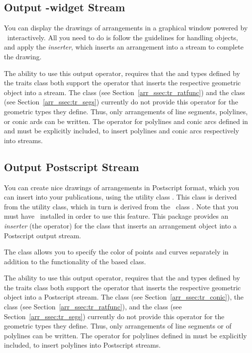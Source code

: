 \subsection{Output \qt{}-widget Stream}\label{arr_ssec:qt_stream}
You can display the drawings of arrangements in a graphical window
powered by \qt\ interactively. All you need to do is follow the
guidelines for handling  objects, and apply the
{\em inserter}, which inserts an arrangement into a 
stream to complete the drawing.

The ability to use this output operator, requires that the
 and  types defined by the
traits class both support the \ccc{<<} operator that inserts the
respective geometric object into a  stream. The
 class (see
Section~\ref{arr_ssec:tr_ratfunc}) and the 
class (see Section~\ref{arr_ssec:tr_segs}) currently do not provide
this operator for the geometric types they define. Thus, only
arrangements of line segments, polylines, or conic ards can be written.
The \ccc{<<} operator for polylines and conic arcs defined in
 and
must be explicitly included, to insert polylines and conic arcs
respectively into  streams.

\subsection{Output Postscript Stream}\label{arr_ssec:ps_stream}
You can create nice drawings of arrangements in Postscript format, which
you can insert into your publications, using the utility class 
. This class is derived from the 
 utility class, which in turn is derived from
the \leda\ class . Note that you must have \leda\ installed
in order to use this feature. 
This package provides an {\em inserter} (the \ccc{<<} operator) for
the  class that inserts an arrangement
object into a Postscript output stream.

The 
class allows you to specify the color of points and curves separately
in addition to the functionality of the based class. 

The ability to use this output operator, requires that the
 and  types defined by the
traits class both support the \ccc{<<} operator that inserts the
respective geometric object into a Postscript stream. The
 class (see Section~\ref{arr_ssec:tr_conic}), the
 class (see Section~\ref{arr_ssec:tr_ratfunc}),
and the  class (see Section~\ref{arr_ssec:tr_segs})
currently do not provide this operator for the geometric types they define.
Thus, only arrangements of line segments or of polylines can be written.
The \ccc{<<} operator for polylines defined in
 must be explicitly
included, to insert polylines into Postscript streams.

